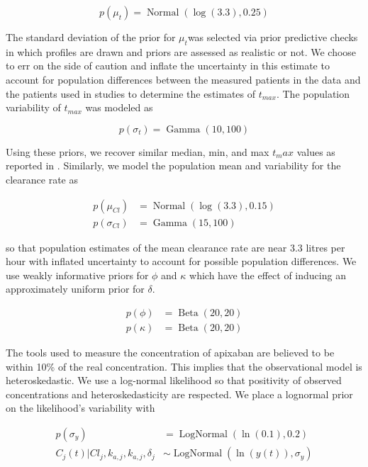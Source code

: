 \begin{equation}\label{eq:eq_10}
 p(\mu_t) = \operatorname{Normal}(\log(3.3), 0.25)
\end{equation}

The standard deviation of the prior for $\mu_t$was selected via prior predictive checks in which profiles are drawn and priors are assessed as realistic or not.  We choose to err on the side of caution and inflate the uncertainty in this estimate to account for population differences between the measured patients in the data and the patients used in studies to determine the estimates of $t_{max}$. The population variability of $t_{max}$ was modeled as

\begin{equation}\label{eq:eq_11}
p(\sigma_t) = \operatorname{Gamma}(10,100)
\end{equation}

\noindent Using these priors, we recover similar median, min, and max $t_max$ values as reported in \cite{Byon2019-gf}. Similarly, we model the population mean and variability for the clearance rate as

\begin{align}
	p(\mu_{Cl}) &= \operatorname{Normal}(\log(3.3), 0.15) \label{eq:eq_12} \\
	p(\sigma_{Cl}) &= \operatorname{Gamma}(15, 100) \label{eq:eq_13}
\end{align}

\noindent so that population estimates of the mean clearance rate are near 3.3 litres per hour with inflated uncertainty to account for possible population differences. We use weakly informative priors for $\phi$ and $\kappa$ which have the effect of inducing an approximately uniform prior for $\delta$.

\begin{align}
	 p(\phi) &= \operatorname{Beta}(20,20) \label{eq:eq_14}\\
	 p(\kappa) &= \operatorname{Beta}(20,20)  \label{eq:eq_15}
\end{align}

The tools used to measure the concentration of apixaban are believed to be within 10\% of the real concentration.  This implies that the observational model is heteroskedastic. We use a log-normal likelihood so that positivity of observed concentrations and heteroskedasticity are respected. We place a lognormal prior on the likelihood’s variability with

\begin{align}
	p(\sigma_y)  &= \operatorname{LogNormal}(\ln(0.1), 0.2) \label{eq:eq_16}\\
	C_{j}(t) \vert Cl_{j}, k_{a,j}, k_{a,j}, \delta_j &\sim \operatorname{LogNormal}(\ln(y(t)), \sigma_y)  \label{eq:eq_17}
\end{align}


